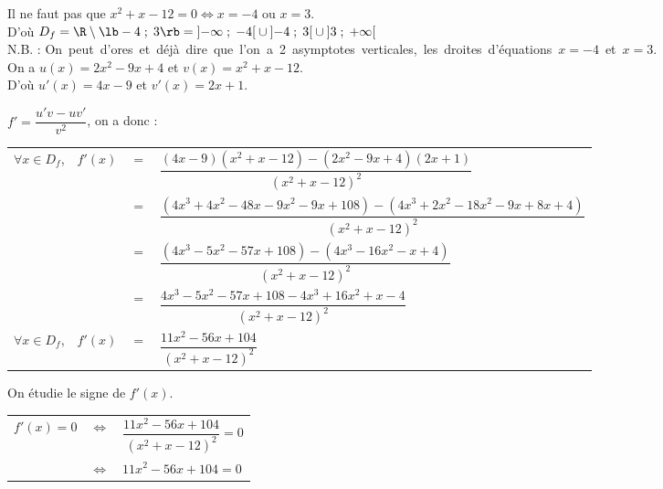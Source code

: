 Il ne faut pas que $x^2 + x - 12 = 0 \Longleftrightarrow x = -4$ ou $x = 3$. \\

D'où $D_f = \R \setminus \lb -4 \; ; \; 3 \rb = \left]-\infty  \; ; \; -4\right[\cup\left]-4 \; ; \; 3\right[\cup\left]3 \; ; \; +\infty\right[$ \\

N.B. : \hbox{On peut d'ores et déjà dire que l'on a 2 asymptotes verticales, les droites d'équations $x = -4$ et $x = 3$.} \\ 

On a $u(x) = 2x^2 - 9x +4$ et $v(x) = x^2 + x - 12$. \\
D'où $u'(x) = 4x - 9$ et $v'(x) = 2x +1 $. 

\vspace*{.3cm}

$f' = \dfrac{u'v - uv'}{v^2}$, on a donc :

\begin{tabular}{llll}
$\forall x \in D_f$, & $f'(x)$ & $=$ & $\dfrac{\left(4x - 9\right)\left(x^2 + x -12\right)-\left(2x^2 - 9x +4\right)\left(2x +1\right)}{\left(x^2 + x - 12\right)^2}$ \vspace*{.3cm} \\
& & $=$ & $\dfrac{\left(4x^3 + 4x^2 - 48x - 9x^2 - 9x + 108\right)-\left(4x^3 + 2x^2 - 18x^2 - 9x + 8x +4\right)}{\left(x^2 + x - 12\right)^2}$ \vspace*{.3cm} \\
& & $=$ & $\dfrac{\left(4x^3 - 5x^2 - 57x + 108\right)-\left(4x^3 - 16x^2 - x + 4\right)}{\left(x^2 + x - 12\right)^2}$ \vspace*{.3cm} \\
& & $=$ & $\dfrac{4x^3 - 5x^2 - 57x + 108 - 4x^3 + 16x^2 + x - 4}{\left(x^2 + x - 12\right)^2}$ \vspace*{.3cm} \\
$\forall x \in D_f$, & $f'(x)$ & $=$ & $\dfrac{11x^2 - 56x + 104}{\left(x^2 + x - 12\right)^2}$ \\
\end{tabular}

On étudie le signe de $f'(x)$. \\

\begin{tabular}{lll}
$f'(x) = 0$ & $\Longleftrightarrow$ & $\dfrac{11x^2 - 56x + 104}{\left(x^2 + x - 12\right)^2} = 0$ \vspace*{.3cm} \\
& $\Longleftrightarrow$ & $11x^2 - 56x + 104 = 0$ \vspace*{.3cm} \\
\end{tabular}

